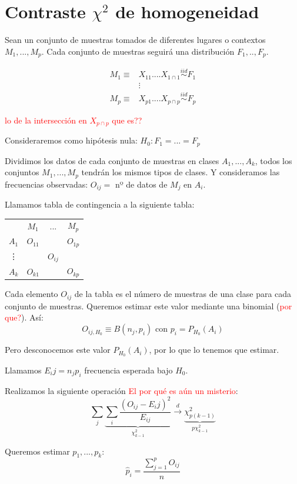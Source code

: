 \documentclass[nochap]{apuntes}
\begin{document}
\section{Contraste $\chi^2$ de homogeneidad}
Sean un conjunto de muestras tomados de diferentes lugares o contextos $M_1,...,M_p$. Cada conjunto de muestras seguirá una distribución $F_1,..,F_p$.

\begin{align*}
M_1 \equiv & X_{11} .... X_{1\cap 1} \stackrel{iid}{\sim} F_1 \\
& \vdots \\
M_p \equiv & X_{p1} .... X_{p\cap p} \stackrel{iid}{\sim} F_p
\end{align*}

\textcolor{red}{lo de la intersección en $X_{p\cap p}$ que es??}

Consideraremos como hipótesis nula: $H_0: F_1=...=F_p$

Dividimos los datos de cada conjunto de muestras en clases $A_1,...,A_k$, todos los conjuntos $M_1,...,M_p$ tendrán los mismos tipos de clases. Y consideramos las frecuencias observadas: $O_{ij}=$ nº de datos de $M_j$ en $A_i$.

Llamamos tabla de contingencia a la siguiente tabla:

\begin{tabular}{cccc}
& $M_1$ & ... & $M_p$ \\
$A_1$ & $O_{11}$ &  & $O_{1p}$ \\
\vdots &  & $O_{ij}$ &  \\
$A_k$ & $O_{k1}$ &  & $O_{kp}$ \\
\end{tabular}

Cada elemento $O_{ij}$ de la tabla es el número de muestras de una clase para cada conjunto de muestras. Queremos estimar este valor mediante una binomial (\textcolor{red}{por que?}). Así:
$$ O_{ij,H_0} \equiv B(n_j, p_i)  \text{ con } p_i=P_{H_0}(A_i)$$

Pero desconocemos este valor $P_{H_0}(A_i)$, por lo que lo tenemos que estimar.

Llamamos $E_ij =n_j p_i$ frecuencia esperada bajo $H_0$.

Realizamos la siguiente operación \textcolor{red}{El por qué es aún un misterio}:
$$ \sum_j \underbrace{\sum_i \frac{(O_{ij}-E_ij)^2}{E_{ij}}}_{\chi^2_{k-1}} \stackrel{d}{\rightarrow} \underbrace{\chi^2_{p(k-1)}}_{p\chi^2_{k-1}} $$

Queremos estimar $p_1,...,p_k$:
$$\hat{p}_i=\frac{\sum_{j=1}^p O_{ij}}{n}$$
\end{document}
